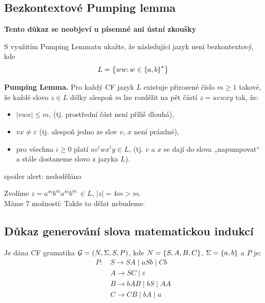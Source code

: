 \subsection{Bezkontextové Pumping lemma}
\textbf{Tento důkaz se neobjeví u písemné ani ústní zkoušky}

S využitím Pumping Lemmatu ukažte, že následující jazyk není bezkontextový, kde $$L = \left\lbrace ww; w \in \left\lbrace a,b \right\rbrace^{\star} \right\rbrace$$


\textbf{Pumping Lemma.} Pro každý CF jazyk $L$ existuje přirozené číslo $m \geq 1$ takové, že každé slovo $z \in L$
délky alespoň $m$ lze rozdělit na pět částí $z = uvwxy$ tak, že:

\begin{itemize}[label=\textbullet]
    \item $\lvert vwx \rvert \leq m$, (tj. prostřední část není příliš dlouhá),
    \item $vx \neq \varepsilon$ (tj. alespoň jedno ze slov $v$, $x$ není prázdné),
    \item pro všechna $i \geq 0$ platí $uv^i wx^i y \in L$, (tj. $v$ a $x$ se dají do slova „napumpovat“ a stále
    dostaneme slovo z jazyka $L$).
\end{itemize}

spoiler alert: nedoděláno

Zvolíme $z = a^m b^m a^m b^m \, \in L$, $|z| = 4m > m$. \\
Máme 7 možností:
Takže to dělat nebudeme.


\subsection{Důkaz generování slova matematickou indukcí} %
Je dána CF gramatika $\mathcal{G} = (N, \Sigma, S, P)$, kde $N = \left\lbrace S, A, B, C \right\rbrace$, $\Sigma = \left\lbrace a, b \right\rbrace$ a $P$ je:
\begin{align*}
    P \text{: } & S \rightarrow SA \mid aSb \mid Cb \\
       & A \rightarrow SC \mid \varepsilon \\
       & B \rightarrow bAB \mid bS \mid AA \\
       & C \rightarrow CB \mid bA \mid a \\
\end{align*}


